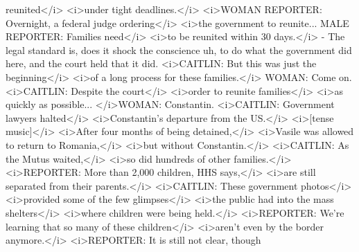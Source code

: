 \begin{itemize}
\begin{itemize}
    reunited\textless{}/i\textgreater{} \textless{}i\textgreater{}under
    tight deadlines.\textless{}/i\textgreater{}
    \textless{}i\textgreater{}WOMAN REPORTER: Overnight, a federal judge
    ordering\textless{}/i\textgreater{} \textless{}i\textgreater{}the
    government to reunite... MALE REPORTER: Families
    need\textless{}/i\textgreater{} \textless{}i\textgreater{}to be
    reunited within 30 days.\textless{}/i\textgreater{} - The legal
    standard is, does it shock the conscience uh, to do what the
    government did here, and the court held that it did.
    \textless{}i\textgreater{}CAITLIN: But this was just the
    beginning\textless{}/i\textgreater{} \textless{}i\textgreater{}of a
    long process for these families.\textless{}/i\textgreater{} WOMAN:
    Come on. \textless{}i\textgreater{}CAITLIN: Despite the
    court\textless{}/i\textgreater{} \textless{}i\textgreater{}order to
    reunite families\textless{}/i\textgreater{}
    \textless{}i\textgreater{}as quickly as possible...
    \textless{}/i\textgreater{}WOMAN: Constantin.
    \textless{}i\textgreater{}CAITLIN: Government lawyers
    halted\textless{}/i\textgreater{}
    \textless{}i\textgreater{}Constantin's departure from the
    US.\textless{}/i\textgreater{} \textless{}i\textgreater{}{[}tense
    music{]}\textless{}/i\textgreater{} \textless{}i\textgreater{}After
    four months of being detained,\textless{}/i\textgreater{}
    \textless{}i\textgreater{}Vasile was allowed to return to
    Romania,\textless{}/i\textgreater{} \textless{}i\textgreater{}but
    without Constantin.\textless{}/i\textgreater{}
    \textless{}i\textgreater{}CAITLIN: As the Mutus
    waited,\textless{}/i\textgreater{} \textless{}i\textgreater{}so did
    hundreds of other families.\textless{}/i\textgreater{}
    \textless{}i\textgreater{}REPORTER: More than 2,000 children, HHS
    says,\textless{}/i\textgreater{} \textless{}i\textgreater{}are still
    separated from their parents.\textless{}/i\textgreater{}
    \textless{}i\textgreater{}CAITLIN: These government
    photos\textless{}/i\textgreater{} \textless{}i\textgreater{}provided
    some of the few glimpses\textless{}/i\textgreater{}
    \textless{}i\textgreater{}the public had into the mass
    shelters\textless{}/i\textgreater{} \textless{}i\textgreater{}where
    children were being held.\textless{}/i\textgreater{}
    \textless{}i\textgreater{}REPORTER: We're learning that so many of
    these children\textless{}/i\textgreater{}
    \textless{}i\textgreater{}aren't even by the border
    anymore.\textless{}/i\textgreater{}
    \textless{}i\textgreater{}REPORTER: It is still not clear, though

\end{itemize}
\end{itemize}
